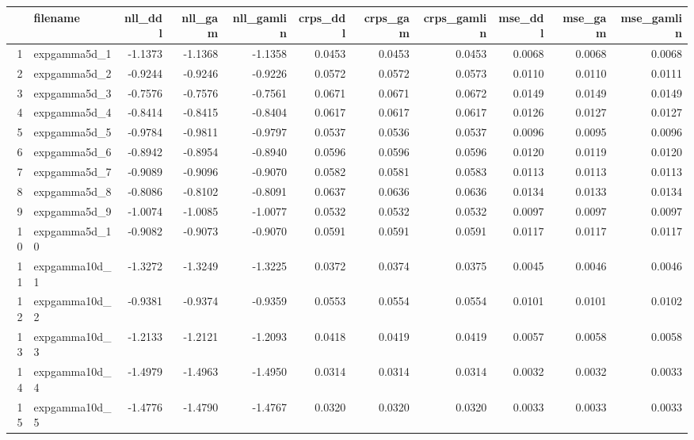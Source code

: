 \begin{table}[ht]
\centering
\begin{tabular}{rlrrrrrrrrr}
  \hline
 & filename & nll\_ddl & nll\_gam & nll\_gamlin & crps\_ddl & crps\_gam & crps\_gamlin & mse\_ddl & mse\_gam & mse\_gamlin \\ 
  \hline
1 & expgamma5d\_1     & -1.1373 & -1.1368 & -1.1358 & 0.0453 & 0.0453 & 0.0453 & 0.0068 & 0.0068 & 0.0068 \\ 
  2 & expgamma5d\_2   & -0.9244 & -0.9246 & -0.9226 & 0.0572 & 0.0572 & 0.0573 & 0.0110 & 0.0110 & 0.0111 \\ 
  3 & expgamma5d\_3   & -0.7576 & -0.7576 & -0.7561 & 0.0671 & 0.0671 & 0.0672 & 0.0149 & 0.0149 & 0.0149 \\ 
  4 & expgamma5d\_4   & -0.8414 & -0.8415 & -0.8404 & 0.0617 & 0.0617 & 0.0617 & 0.0126 & 0.0127 & 0.0127 \\ 
  5 & expgamma5d\_5   & -0.9784 & -0.9811 & -0.9797 & 0.0537 & 0.0536 & 0.0537 & 0.0096 & 0.0095 & 0.0096 \\ 
  6 & expgamma5d\_6   & -0.8942 & -0.8954 & -0.8940 & 0.0596 & 0.0596 & 0.0596 & 0.0120 & 0.0119 & 0.0120 \\ 
  7 & expgamma5d\_7   & -0.9089 & -0.9096 & -0.9070 & 0.0582 & 0.0581 & 0.0583 & 0.0113 & 0.0113 & 0.0113 \\ 
  8 & expgamma5d\_8   & -0.8086 & -0.8102 & -0.8091 & 0.0637 & 0.0636 & 0.0636 & 0.0134 & 0.0133 & 0.0134 \\ 
  9 & expgamma5d\_9   & -1.0074 & -1.0085 & -1.0077 & 0.0532 & 0.0532 & 0.0532 & 0.0097 & 0.0097 & 0.0097 \\ 
  10 & expgamma5d\_10 & -0.9082 & -0.9073 & -0.9070 & 0.0591 & 0.0591 & 0.0591 & 0.0117 & 0.0117 & 0.0117 \\ 
  11 & expgamma10d\_1 & -1.3272 & -1.3249 & -1.3225 & 0.0372 & 0.0374 & 0.0375 & 0.0045 & 0.0046 & 0.0046 \\ 
  12 & expgamma10d\_2 & -0.9381 & -0.9374 & -0.9359 & 0.0553 & 0.0554 & 0.0554 & 0.0101 & 0.0101 & 0.0102 \\ 
  13 & expgamma10d\_3 & -1.2133 & -1.2121 & -1.2093 & 0.0418 & 0.0419 & 0.0419 & 0.0057 & 0.0058 & 0.0058 \\ 
  14 & expgamma10d\_4 & -1.4979 & -1.4963 & -1.4950 & 0.0314 & 0.0314 & 0.0314 & 0.0032 & 0.0032 & 0.0033 \\ 
  15 & expgamma10d\_5 & -1.4776 & -1.4790 & -1.4767 & 0.0320 & 0.0320 & 0.0320 & 0.0033 & 0.0033 & 0.0033 \\ 

\end{tabular}
\end{table}
